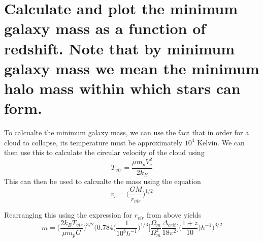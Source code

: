 \documentclass[11pt]{article}
\begin{document}
    \section{Calculate and plot the minimum galaxy mass as a function of
redshift. Note that by minimum galaxy mass we mean the minimum halo mass
within which stars can
form.}\label{calculate-and-plot-the-minimum-galaxy-mass-as-a-function-of-redshift.-note-that-by-minimum-galaxy-mass-we-mean-the-minimum-halo-mass-within-which-stars-can-form.}

To calcualte the minimum galaxy mass, we can use the fact that in order
for a cloud to collapse, its temperature must be approximately \(10^4\)
Kelvin. We can then use this to calculate the circular velocity of the
cloud using \[T_{vir} = \frac{\mu m_p V_c^2}{2 k_B}\] This can then be
used to calcualte the mass using the equation
\[ v_c = \Big(\frac{G M }{r_{vir}}\Big)^{1/2} \]

Rearranging this using the expression for \(r_{vir}\) from above yields
\[ m = \Big( \frac{2 k_B T_{vir} }{\mu m_p G} \Big)^{3/2} \Bigg( 0.784 \bigg( \frac{1}{10^8 h^{-1} }\bigg)^{1/3} \bigg[ \frac{\Omega_m}{\Omega_m^z} \frac{\Delta_{crit}}{18 \pi^2} \bigg] \bigg(\frac{1+z}{10} \bigg) h^{-1}  \Bigg)^{3/2}\]
\end{document}
